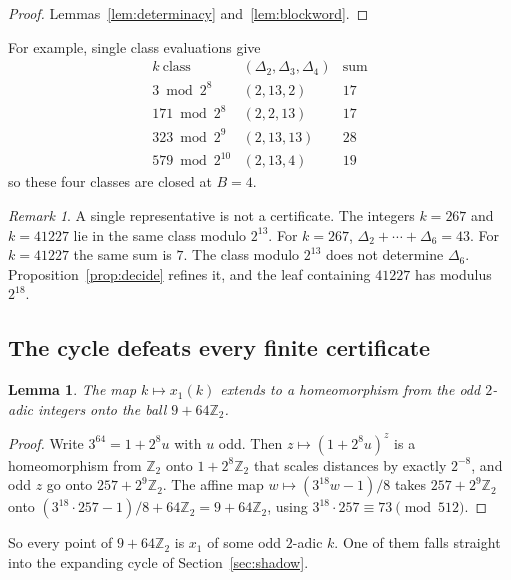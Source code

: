 \documentclass[11pt]{article}
\newtheorem{lemma}[theorem]{Lemma}
\theoremstyle{definition}
\theoremstyle{remark}
\newtheorem{remark}[theorem]{Remark}
\newcommand{\Z}{\mathbb{Z}}
\begin{document}
\begin{proof}
Lemmas~\ref{lem:determinacy} and~\ref{lem:blockword}.
\end{proof}

For example, single class evaluations give
\[
\begin{array}{c|c|c}
k\ \text{class} & (\Delta_2,\Delta_3,\Delta_4) & \text{sum}\\\hline
3\bmod2^{8} & (2,13,2) & 17\\
171\bmod2^{8} & (2,2,13) & 17\\
323\bmod2^{9} & (2,13,13) & 28\\
579\bmod2^{10} & (2,13,4) & 19
\end{array}
\]
so these four classes are closed at $B=4$.

\begin{remark}\label{rem:onerep}
A single representative is not a certificate. The integers $k=267$ and
$k=41227$ lie in the same class modulo $2^{13}$. For $k=267$,
$\Delta_2+\cdots+\Delta_6=43$. For $k=41227$ the same sum is $7$. The
class modulo $2^{13}$ does not determine $\Delta_6$.
Proposition~\ref{prop:decide} refines it, and the leaf containing $41227$
has modulus $2^{18}$.
\end{remark}

\subsection*{The cycle defeats every finite certificate}

\begin{lemma}\label{lem:ball}
The map $k\mapsto x_1(k)$ extends to a homeomorphism from the odd
$2$-adic integers onto the ball $9+64\Z_2$.
\end{lemma}

\begin{proof}
Write $3^{64}=1+2^{8}u$ with $u$ odd. Then $z\mapsto(1+2^{8}u)^{z}$
is a homeomorphism from $\Z_2$ onto $1+2^{8}\Z_2$ that scales distances
by exactly $2^{-8}$, and odd $z$ go onto $257+2^{9}\Z_2$. The affine map
$w\mapsto(3^{18}w-1)/8$ takes $257+2^{9}\Z_2$ onto
$(3^{18}\cdot257-1)/8+64\Z_2=9+64\Z_2$, using
$3^{18}\cdot257\equiv73\pmod{512}$.
\end{proof}

So every point of $9+64\Z_2$ is $x_1$ of some odd $2$-adic $k$. One of
them falls straight into the expanding cycle of
Section~\ref{sec:shadow}.
\end{document}
